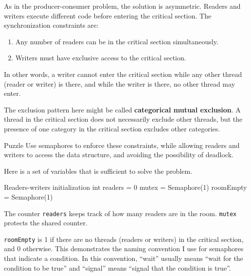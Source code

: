 As in the producer-consumer problem, the solution is asymmetric.
Readers and writers execute different code before entering the
critical section.  The synchronization constraints are:

\begin{enumerate}

\item Any number of readers can be in the critical section
simultaneously.

\item Writers must have exclusive access to the critical section.

\end{enumerate}

In other words, a writer cannot enter the critical section while
any other thread (reader or writer) is there, and while the writer
is there, no other thread may enter.

The exclusion pattern here might be called {\bf categorical
mutual exclusion}.  A thread in the critical section
does not necessarily exclude other threads, but the presence
of one category in the critical section excludes other
categories.

\begin{puzzlebox}{Puzzle}
Use semaphores to enforce these constraints, while allowing
readers and writers to access the data structure, and avoiding
the possibility of deadlock.



Here is a set of variables that is sufficient to solve the
problem.

\begin{lstbox}{Readers-writers initialization}
int readers = 0
mutex = Semaphore(1)
roomEmpty = Semaphore(1)
\end{lstbox}

The counter {\tt readers} keeps track of how many readers
are in the room.  {\tt mutex} protects the shared counter.

{\tt roomEmpty} is 1 if there are no threads (readers or writers) in
the critical section, and 0 otherwise.  This demonstrates the naming
convention I use for semaphores that indicate a condition.  In
this convention, ``wait'' usually means ``wait for the condition to
be true'' and ``signal'' means ``signal that the condition is true''.
\end{puzzlebox}


{}

